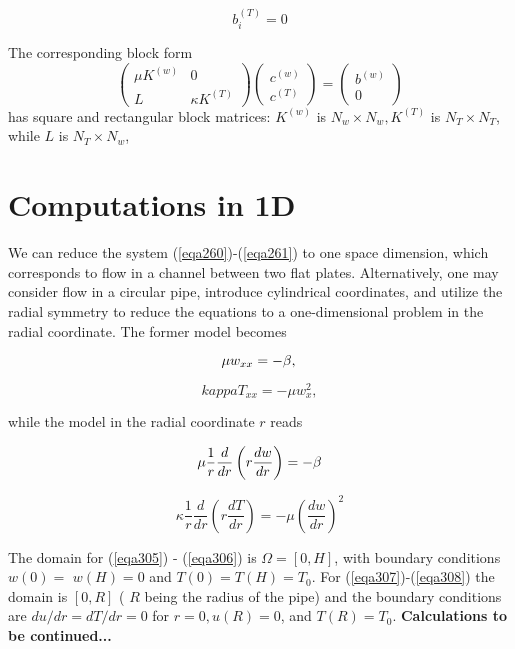 \documentclass[../main.tex]{subfiles}
\begin{document}
		\begin{equation}
			\label{304}	
			b_{i}^{(T)}=0
		\end{equation}
		
		\noindent The corresponding block form
		$$
		\left(\begin{array}{cc}
			\mu K^{(w)} & 0 \\
			L & \kappa K^{(T)}
		\end{array}\right)\left(\begin{array}{c}
			c^{(w)} \\
			c^{(T)}
		\end{array}\right)=\left(\begin{array}{c}
			b^{(w)} \\
			0
		\end{array}\right)
		$$
		has square and rectangular block matrices: $K^{(w)}$ is $N_{w} \times N_{w}, K^{(T)}$ is $N_{T} \times N_{T}$, while $L$ is $N_{T} \times N_{w}$,
	\section[Computations in 1D]{Computations in 1D}
		\label{sec:sec_20_5}
		\noindent We can reduce the system (\ref{eqa260})-(\ref{eqa261}) to one space dimension, which corresponds to flow in a channel between two flat plates. Alternatively, one may consider flow in a circular pipe, introduce cylindrical coordinates, and utilize the radial symmetry to reduce the equations to a one-dimensional problem in the radial coordinate. The former model becomes
		
		\begin{equation}
			\label{eqa305}
			\mu w_{x x}=-\beta, \\
		\end{equation}
	
		\begin{equation}
		\label{eqa306}
			kappa T_{x x}=-\mu w_{x}^{2},
		\end{equation}
		
		\noindent while the model in the radial coordinate $r$ reads
		
		\begin{equation}
			\label{eqa307}
			\mu \frac{1}{r} \frac{d}{d r}\left(r \frac{d w}{d r}\right)=-\beta \\
		\end{equation}
		
		\begin{equation}
			\label{eqa308}
			\kappa \frac{1}{r} \frac{d}{d r}\left(r \frac{d T}{d r}\right)=-\mu\left(\frac{d w}{d r}\right)^{2}
		\end{equation}
		
		The domain for (\ref{eqa305}) - (\ref{eqa306}) is $\Omega=[0, H]$, with boundary conditions $w(0)=$ $w(H)=0$ and $T(0)=T(H)=T_{0}$. For (\ref{eqa307})-(\ref{eqa308}) the domain is $[0, R]$ ( $R$ being the radius of the pipe) and the boundary conditions are $d u / d r=d T / d r=0$ for $r=0, u(R)=0$, and $T(R)=T_{0} .$\smallbreak
		\textbf{Calculations to be continued...}
	


\clearpage
\end{document}

